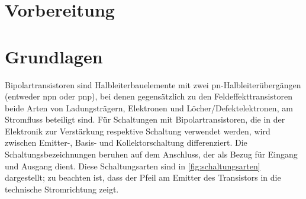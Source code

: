 \documentclass[12pt,english,ngerman]{scrartcl}
\begin{document}
% 
\tableofcontents
\newpage




% 

\section{Vorbereitung}\label{sec:Vorbereitung}
%


\section{Grundlagen}\label{sec:Grundlagen}

Bipolartransistoren sind Halbleiterbauelemente mit zwei pn-Halbleiterübergängen
(entweder npn oder pnp), bei denen gegensätzlich zu den Feldeffekttransistoren
beide Arten von Ladungsträgern, Elektronen und Löcher/Defektelektronen, am
Stromfluss beteiligt sind. Für Schaltungen mit Bipolartransistoren, die in der
Elektronik zur Verstärkung respektive Schaltung verwendet werden, wird zwischen
Emitter-, Basis- und Kollektorschaltung differenziert. Die
Schaltungsbezeichnungen beruhen auf dem Anschluss, der als Bezug für Eingang
und Ausgang dient. Diese Schaltungsarten sind in 
\autoref{fig:schaltungsarten} dargestellt; zu beachten ist, dass der Pfeil am
Emitter des Transistors in die technische Stromrichtung zeigt. 
\end{document}
